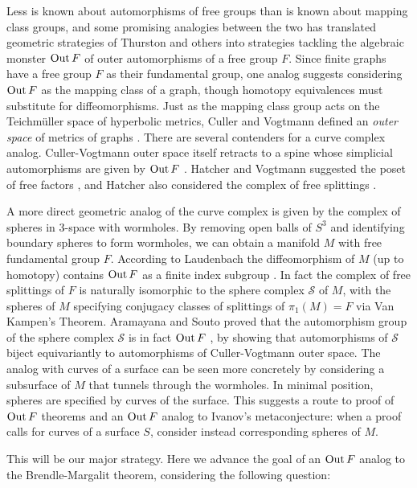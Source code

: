 Less is known about automorphisms of free groups than is known about mapping class groups,
and some promising analogies between the two has translated geometric strategies of Thurston
and others into strategies tackling the algebraic monster $\operatorname{Out} F$ of outer automorphisms of a free group $F$.
Since finite graphs have a free group $F$ as their fundamental group,
one analog suggests considering $\operatorname{Out} F$ as the mapping class of a graph, though homotopy equivalences must substitute for diffeomorphisms.
Just as the mapping class group acts on the Teichm\"uller space of hyperbolic metrics,
Culler and Vogtmann defined an \emph{outer space}  of metrics of graphs \cite{MR830040}.
There are several contenders for a curve complex analog.
Culler-Vogtmann outer space itself retracts to a spine whose simplicial automorphisms are given by  $\operatorname{Out} F$
\cite{vogt}.
Hatcher and Vogtmann suggested the poset of free factors \cite{MR1660045}, and Hatcher also considered the complex of free splittings \cite{MR1314940}.

A more direct geometric analog of the curve complex is given by the complex of spheres in 3-space with wormholes.
By removing open balls of $S^3$ and identifying boundary spheres to form wormholes, we can obtain a manifold $M$ with free fundamental group $F$.
According to
Laudenbach the diffeomorphism of $M$ (up to homotopy) contains $\operatorname{Out} F$ as a finite index subgroup \cite{MR0314054}.
In fact the complex of free splittings of $F$ is naturally isomorphic to the sphere complex $\mathcal S$ of $M$,
with the spheres of $M$ specifying conjugacy classes of splittings of $\pi_1(M)=F$
via
Van Kampen's Theorem.
Aramayana and Souto proved that the automorphism group of the sphere complex $\mathcal S$ is in fact $\operatorname{Out} F$ \cite{souto},
by showing that automorphisms of $\mathcal S$ biject equivariantly to automorphisms of Culler-Vogtmann outer space.
The analog with curves of a surface can be seen more concretely by considering a subsurface of $M$ that tunnels
through the wormholes. In minimal position, spheres are specified by curves of the surface.
This suggests a route to proof of $\operatorname{Out} F$ theorems and an $\operatorname{Out} F$ analog to Ivanov's metaconjecture:
when a proof calls for curves of a surface $S$, consider instead corresponding spheres of $M$.

This will be our major strategy.
Here we advance the goal of an $\operatorname{Out} F$ analog to the Brendle-Margalit theorem, considering the following question:

